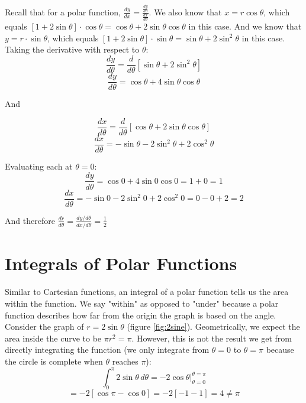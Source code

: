 \begin{Answer}[ref = polar1]
Recall that for a polar function, $\frac{dy}{dx} = \frac{\frac{dy}{d\theta}}{
\frac{dx}{d\theta}}$. We also know that $x = r \cos{\theta}$, which equals 
$\left[ 1 + 2\sin{\theta} \right] \cdot \cos{\theta} = \cos{\theta} + 2\sin{
\theta}\cos{\theta}$ in this case. And we know that $y = r \cdot \sin{\theta}$, 
which equals $\left[ 1 + 2 \sin{\theta} \right] \cdot \sin{\theta} = \sin{
\theta} + 2 \sin^2{\theta}$ in this case. Taking the derivative with respect 
to $\theta$:
$$\frac{dy}{d\theta} = \frac{d}{d\theta} \left[ \sin{\theta} + 2 \sin^2{\theta} 
\right]$$
$$\frac{dy}{d\theta} = \cos{\theta} + 4\sin{\theta}\cos{\theta}$$

And

$$\frac{dx}{d\theta} = \frac{d}{d\theta} \left[ \cos{\theta} + 2\sin{\theta}\cos{
\theta} \right]$$
$$\frac{dx}{d\theta} = -\sin{\theta} - 2\sin^2{\theta} + 2\cos^2{\theta}$$

Evaluating each at $\theta = 0$:
$$\frac{dy}{d\theta} = \cos{0} + 4\sin{0}\cos{0} = 1 + 0 = 1$$
$$\frac{dx}{d\theta} = -\sin{0} - 2\sin^2{0} + 2\cos^2{0} = 0 - 0 + 2 = 2$$

And therefore $\frac{dr}{d\theta} = \frac{dy/d\theta}{dx/d\theta} = \frac{1}{2}$
\end{Answer}

\section{Integrals of Polar Functions}
Similar to Cartesian functions, an integral of a polar function tells us the 
area within the function. We say "within" as opposed to "under" because a 
polar function describes how far from the origin the graph is based on the 
angle. Consider the graph of $r = 2\sin{\theta}$ (figure \ref{fig:2sine}). 
Geometrically, we expect the area inside the curve to be $\pi r^2 = \pi$. 
However, this is not the result we get from directly integrating the function 
(we only integrate from $\theta = 0$ to $\theta = \pi$ because the circle is 
complete when $\theta$ reaches $\pi$): 
$$\int_0^{\pi} 2\sin{\theta}\,d\theta = -2\cos{\theta}|_{\theta = 0}^{\theta 
= \pi}$$
$$= -2 \left[ \cos{\pi} - \cos{0} \right] = -2 \left[ -1 - 1 \right] = 4 \neq 
\pi$$

